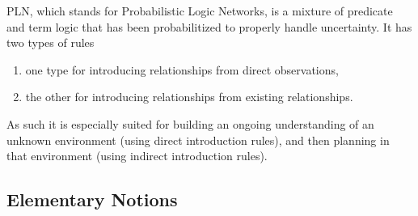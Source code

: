 \documentclass[runningheads]{llncs}
\begin{document}
PLN, which stands for Probabilistic Logic Networks, is a mixture of
predicate and term logic that has been probabilitized to properly
handle uncertainty.  It has two types of rules
\begin{enumerate}
\item one type for introducing relationships from direct observations,
\item the other for introducing relationships from existing
  relationships.
\end{enumerate}
As such it is especially suited for building an ongoing understanding
of an unknown environment (using direct introduction rules), and then
planning in that environment (using indirect introduction rules).

\subsection{Elementary Notions}


%
%
%

\end{document}

